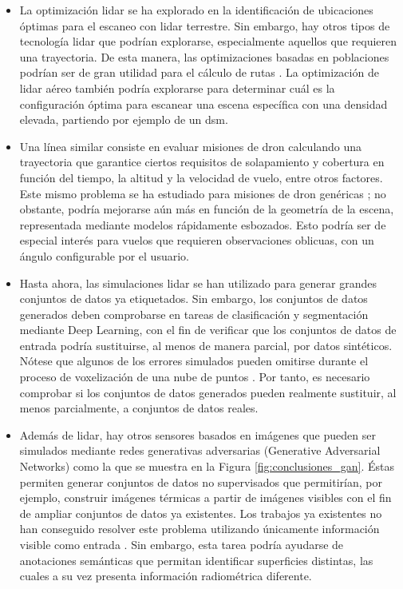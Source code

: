 \begin{itemize}
    \item La optimización \acrshort{lidar} se ha explorado en la identificación de ubicaciones óptimas para el escaneo con \acrshort{lidar} terrestre. Sin embargo, hay otros tipos de tecnología \acrshort{lidar} que podrían explorarse, especialmente aquellos que requieren una trayectoria. De esta manera, las optimizaciones basadas en poblaciones podrían ser de gran utilidad para el cálculo de rutas \cite{roberge_fast_2018}. La optimización de \acrshort{lidar} aéreo también podría explorarse para determinar cuál es la configuración óptima para escanear una escena específica con una densidad elevada, partiendo por ejemplo de un \acrshort{dsm}.
    \item Una línea similar consiste en evaluar misiones de dron calculando una trayectoria que garantice ciertos requisitos de solapamiento y cobertura en función del tiempo, la altitud y la velocidad de vuelo, entre otros factores. Este mismo problema se ha estudiado para misiones de dron genéricas \cite{pessacg_simplifying_2022}; no obstante, podría mejorarse aún más en función de la geometría de la escena, representada mediante modelos rápidamente esbozados. Esto podría ser de especial interés para vuelos que requieren observaciones oblicuas, con un ángulo configurable por el usuario. 
    \item Hasta ahora, las simulaciones \acrshort{lidar} se han utilizado para generar grandes conjuntos de datos ya etiquetados. Sin embargo, los conjuntos de datos generados deben comprobarse en tareas de clasificación y segmentación mediante Deep Learning, con el fin de verificar que los conjuntos de datos de entrada podría sustituirse, al menos de manera parcial, por datos sintéticos. Nótese que algunos de los errores simulados pueden omitirse durante el proceso de voxelización de una nube de puntos \cite{hackel_semantic3d_2017, behley_towards_2021}. Por tanto, es necesario comprobar si los conjuntos de datos generados pueden realmente sustituir, al menos parcialmente, a conjuntos de datos reales. 
    \item Además de \acrshort{lidar}, hay otros sensores basados en imágenes que pueden ser simulados mediante redes generativas adversarias (Generative Adversarial Networks) como la que se muestra en la Figura \ref{fig:conclusiones_gan}. Éstas permiten generar conjuntos de datos no supervisados que permitirían, por ejemplo, construir imágenes térmicas a partir de imágenes visibles con el fin de ampliar conjuntos de datos ya existentes. Los trabajos ya existentes no han conseguido resolver este problema utilizando únicamente información visible como entrada \cite{li_multi-branch_2019, li_i-gans_2021, kniaz_thermalgan_2019, ozkanoglu_infragan_2022, yi_cycle_2023}. Sin embargo, esta tarea podría ayudarse de anotaciones semánticas que permitan identificar superficies distintas, las cuales a su vez presenta información radiométrica diferente.

\end{itemize}
